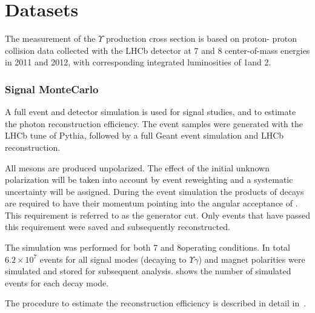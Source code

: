 \section{Datasets}
\label{sec:datasets}

The measurement of the $\Upsilon$ production cross section is based on proton-
proton collision data collected with the LHCb detector at 7 and 8\tev
center-of-mass energies in 2011 and 2012, with corresponding integrated luminosities
of 1\invfb and 2\invfb.

\subsubsection{Signal MonteCarlo}

A full event and detector simulation is used for signal studies, and to
estimate the photon reconstruction efficiency. The event samples were
generated with the LHCb tune of Pythia\cite{LHCb-PROC-2010-056}, followed by a
full Geant\cite{Allison:2006ve} event simulation and LHCb reconstruction.

All \chib mesons are produced unpolarized. The effect of the initial unknown polarization 
will be taken into account by event reweighting and a systematic uncertainty will be assigned.  
During the event simulation the products of \chib decays are required
to have their momentum pointing into the angular acceptance of \lhcb. This
requirement is referred to as the generator cut. Only events that have passed this
requirement were saved and subsequently reconstructed.

The simulation was performed for both 7 and 8\tev operating conditions. In
total $6.2\times10^7$ events for all signal modes (\chib decaying to $\Upsilon
\gamma$) and magnet polarities were simulated and stored for subsequent
analysis.  shows the number of simulated events for each decay
mode.




The procedure to estimate the
reconstruction efficiency is described in detail in~.


